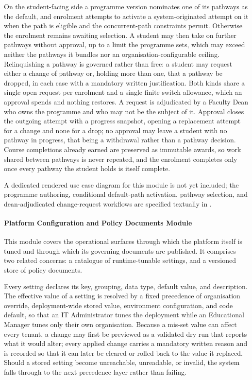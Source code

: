 On the student-facing side a programme version nominates one of its pathways as the default, and enrolment attempts to activate a system-originated attempt on it when the path is eligible and the concurrent-path constraints permit. Otherwise the enrolment remains awaiting selection. A student may then take on further pathways without approval, up to a limit the programme sets, which may exceed neither the pathways it bundles nor an organisation-configurable ceiling. Relinquishing a pathway is governed rather than free: a student may request either a change of pathway or, holding more than one, that a pathway be dropped, in each case with a mandatory written justification. Both kinds share a single open request per enrolment and a single finite switch allowance, which an approval spends and nothing restores. A request is adjudicated by a Faculty Dean who owns the programme and who may not be the subject of it. Approval closes the outgoing attempt with a progress snapshot, opening a replacement attempt for a change and none for a drop; no approval may leave a student with no pathway in progress, that being a withdrawal rather than a pathway decision. Course completions already earned are preserved as immutable awards, so work shared between pathways is never repeated, and the enrolment completes only once every pathway the student holds is itself complete.

\noindent A dedicated rendered use case diagram for this module is not yet included; the programme authoring, conditional default-path activation, pathway selection, and dean-adjudicated change-request workflows are specified textually in .


\paragraph{Platform Configuration and Policy Documents Module}

This module covers the operational surfaces through which the platform itself is tuned and through which its governing documents are published. It comprises two related concerns: a catalogue of runtime-tunable settings, and a versioned store of policy documents.

Every setting declares its key, grouping, data type, default value, and description. The effective value of a setting is resolved by a fixed precedence of organisation override, deployment-wide stored value, environment configuration, and code default, so that an IT Administrator tunes the deployment while an Educational Manager tunes only their own organisation. Because a mis-set value can affect every tenant, a change may first be previewed as a validated dry run that reports what it would alter; every applied change carries a mandatory written reason and is recorded so that it can later be cleared or rolled back to the value it replaced. Should a stored setting become unreachable, unreadable, or invalid, the system falls through to the next precedence layer rather than failing.

